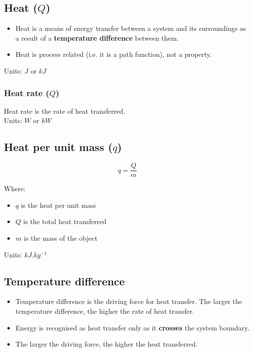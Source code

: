 \documentclass[11pt]{article}
\begin{document}
\subsection{Heat (\(Q\))}
\label{sec:orgb7f5e7e}
\begin{itemize}
\item Heat is a means of energy transfer between a system and its surroundings as a result of a \textbf{temperature difference} between them.
\item Heat is process related (i.e. it is a path function), not a property.
\end{itemize}

Units: \(\unit{J}\) or \(\unit{kJ}\)

\subsubsection{Heat rate (\(Q\))}
\label{sec:orgdcd0368}
Heat rate is the rate of heat transferred.
\\[0pt]

 \noindent Units: \(\unit{W}\) or \(\unit{kW}\)

\subsection{Heat per unit mass (\(q\))}
\label{sec:orgd3b3e2b}
\[q = \frac{Q}{m}\]

Where:
\begin{itemize}
\item \(q\) is the heat per unit mass
\item \(Q\) is the total heat transferred
\item \(m\) is the mass of the object
\end{itemize}

Units: \(\unit{kJ.kg^{-1}}\)

\subsection{Temperature difference}
\label{sec:orgc872303}
\begin{itemize}
\item Temperature difference is the driving force for heat transfer. The larger the temperature difference, the higher the rate of heat transfer.
\item Energy is recognised as heat transfer only as it \textbf{crosses} the system boundary.
\item The larger the driving force, the higher the heat transferred.
\end{itemize}
\end{document}
